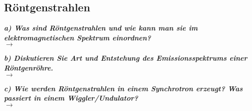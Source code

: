 \subsection{\label{subsec:FZV1}Röntgenstrahlen}
\textbf{\textit{a) Was sind Röntgenstrahlen und wie kann man sie im elektromagnetischen
Spektrum einordnen?}}\\
$\rightarrow$

\textbf{\textit{b) Diskutieren Sie Art und Entstehung des Emissionsspektrums einer 
Röntgenröhre.}}\\
$\rightarrow$

\textbf{\textit{c) Wie werden Röntgenstrahlen in einem Synchrotron erzeugt? Was passiert
in einem Wiggler/Undulator?}}\\
$\rightarrow$